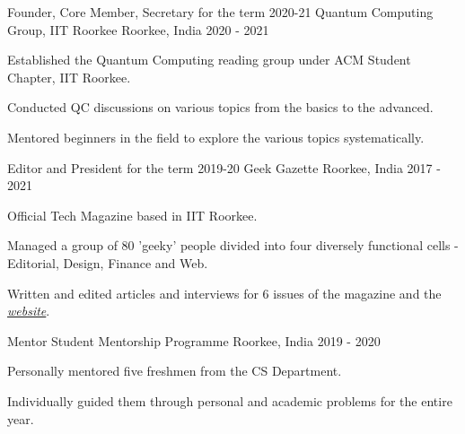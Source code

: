

\begin{cventries}
  \cventry
    {Founder, Core Member, Secretary for the term 2020-21} %
    {Quantum Computing Group, IIT Roorkee} %
    {Roorkee, India} %
    {2020 - 2021} %
    {
      \begin{cvitems} %
        \item {Established the Quantum Computing reading group under ACM Student Chapter, IIT Roorkee.}
        \item {Conducted QC discussions on various topics from the basics to the advanced.}
        \item {Mentored beginners in the field to explore the various topics systematically.}
    \end{cvitems}
    }

  \cventry
    {Editor and President for the term 2019-20} %
    {Geek Gazette} %
    {Roorkee, India} %
    {2017 - 2021} %
    {
      \begin{cvitems} %
        \item {Official Tech Magazine based in IIT Roorkee.}
        \item {Managed a group of 80 'geeky' people divided into four diversely functional cells - Editorial, Design, Finance and Web.}
        \item {Written and edited articles and interviews for 6 issues of the magazine and the \emph{\href{https://geekgazette.iitr.ac.in}{website}}.}
      \end{cvitems}
    }

  \cventry
    {Mentor} %
    {Student Mentorship Programme} %
    {Roorkee, India} %
    {2019 - 2020} %
    {
      \begin{cvitems} %
        \item {Personally mentored five freshmen from the CS Department.}
        \item {Individually guided them through personal and academic problems for the entire year.}
      \end{cvitems}
    }


\end{cventries}
